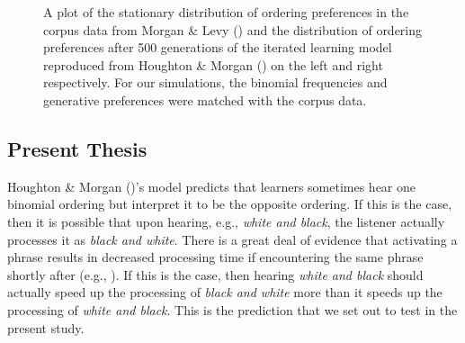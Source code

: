 \documentclass[
  12pt,
]{scrartcl}
\begin{document}
\begin{figure}[htbp]

\caption{\label{fig-corpusourmodel}A plot of the stationary distribution
of ordering preferences in the corpus data from Morgan \& Levy
() and
the distribution of ordering preferences after 500 generations of the
iterated learning model reproduced from Houghton \& Morgan
()
on the left and right respectively. For our simulations, the binomial
frequencies and generative preferences were matched with the corpus
data.}


\end{figure}%

\subsection{Present Thesis}\label{present-thesis}

Houghton \& Morgan
()'s
model predicts that learners sometimes hear one binomial ordering but
interpret it to be the opposite ordering. If this is the case, then it
is possible that upon hearing, e.g., \emph{white and black}, the
listener actually processes it as \emph{black and white}. There is a
great deal of evidence that activating a phrase results in decreased
processing time if encountering the same phrase shortly after (e.g.,
). If this is the case, then hearing \emph{white and
black} should actually speed up the processing of \emph{black and white}
more than it speeds up the processing of \emph{white and black}. This is
the prediction that we set out to test in the present study.
\end{document}
